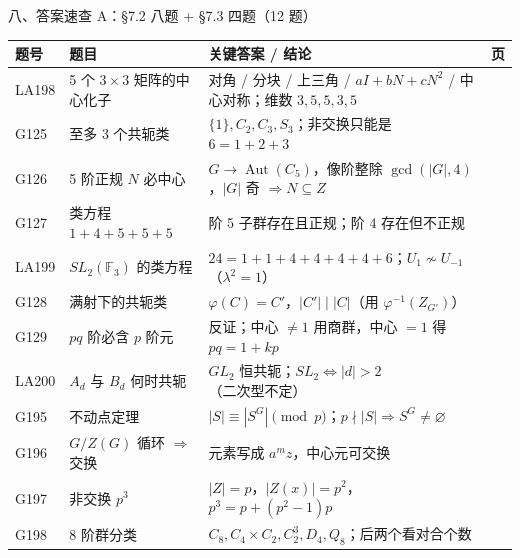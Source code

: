 \documentclass[aspectratio=169,10pt,fontset=none]{ctexbeamer}
\begin{document}
\begin{frame}[t]{八、答案速查 A：\S7.2 八题 + \S7.3 四题（12 题）}
  \label{sec:answers}
  \centering
  \scriptsize
  \setlength{\tabcolsep}{3pt}
  \renewcommand{\arraystretch}{1.16}
  \begin{tabular}{@{}l l l c@{}}
    \toprule
    题号 & 题目 & 关键答案 / 结论 & 页\\
    \midrule
    LA198 & 5 个 $3\times3$ 矩阵的中心化子 & 对角 / 分块 / 上三角 / $aI+bN+cN^2$ / 中心对称；维数 $3,5,5,3,5$ & \pageref{ex:LA198}\\
    G125 & 至多 3 个共轭类 & $\{1\},C_2,C_3,S_3$；非交换只能是 $6=1+2+3$ & \pageref{ex:G125}\\
    G126 & 5 阶正规 $N$ 必中心 & $G\to\operatorname{Aut}(C_5)$，像阶整除 $\gcd(|G|,4)$，$|G|$ 奇 $\Rightarrow N\subseteq Z$ & \pageref{ex:G126}\\
    G127 & 类方程 $1+4+5+5+5$ & 阶 5 子群存在且正规；阶 4 存在但不正规 & \pageref{ex:G127}\\
    LA199 & $SL_2(\mathbb F_3)$ 的类方程 & $24=1+1+4+4+4+4+6$；$U_1\nsim U_{-1}$（$\lambda^2=1$） & \pageref{ex:LA199}\\
    G128 & 满射下的共轭类 & $\varphi(C)=C'$，$|C'|\mid|C|$（用 $\varphi^{-1}(Z_{G'})$） & \pageref{ex:G128}\\
    G129 & $pq$ 阶必含 $p$ 阶元 & 反证；中心 $\ne1$ 用商群，中心 $=1$ 得 $pq=1+kp$ & \pageref{ex:G129}\\
    LA200 & $A_d$ 与 $B_d$ 何时共轭 & $GL_2$ 恒共轭；$SL_2\iff |d|>2$（二次型不定） & \pageref{ex:LA200}\\
    G195 & 不动点定理 & $|S|\equiv|S^G|\pmod p$；$p\nmid|S|\Rightarrow S^G\ne\varnothing$ & \pageref{ex:G195}\\
    G196 & $G/Z(G)$ 循环 $\Rightarrow$ 交换 & 元素写成 $a^m z$，中心元可交换 & \pageref{ex:G196}\\
    G197 & 非交换 $p^3$ & $|Z|=p$，$|Z(x)|=p^2$，$p^3=p+(p^2-1)p$ & \pageref{ex:G197}\\
    G198 & 8 阶群分类 & $C_8,C_4\times C_2,C_2^3,D_4,Q_8$；后两个看对合个数 & \pageref{ex:G198}\\
    \bottomrule
  \end{tabular}
\end{frame}
\end{document}
